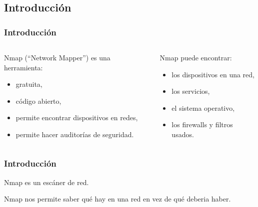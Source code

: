\documentclass[aspectratio=169]{beamer}
\begin{document}
\subsection{Introducci\'on}
\begin{frame}

    \frametitle{Introducci\'on}

    \begin{columns}
        \begin{column}{0.5\textwidth}

            Nmap (``Network Mapper'') es una herramienta:

            \begin{itemize}
                \item gratuita,
                \item c\'odigo abierto,
                \item permite encontrar dispositivos en redes,
                \item permite hacer auditor\'ias de seguridad.
            \end{itemize}

        \end{column}

        \pause

        \begin{column}{0.5\textwidth}
    
            Nmap puede encontrar:

            \begin{itemize}
                \item los dispositivos en una red,
                \item los servicios,
                \item el sistema operativo,
                \item los firewalls y filtros usados.
            \end{itemize}

        \end{column}
    \end{columns}

\end{frame}

\begin{frame}

    \frametitle{Introducci\'on}

    \begin{block}{}
        \begin{center}
            Nmap es un esc\'aner de red.
        \end{center}
    \end{block}

    \pause

    \begin{block}{}
        \begin{center}
            Nmap nos permite saber qu\'e hay en una red en vez de qu\'e deberia haber.
        \end{center}
    \end{block}

\end{frame}
\end{document}

